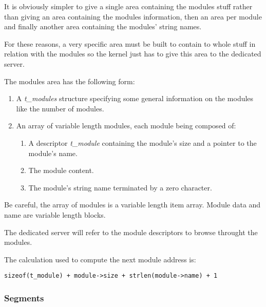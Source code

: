 It is obviously simpler to give a single area containing the modules
stuff rather than giving an area containing the modules information, then
an area per module and finally another area containing the modules' string
names.

For these reasons, a very specific area must be built to contain
to whole stuff in relation with the modules so the kernel just has to
give this area to the dedicated server.

The modules area has the following form:

\begin{enumerate}
  \item
    A \textit{t\_modules} structure specifying some general information on
    the modules like the number of modules.
  \item
    An array of variable length modules, each module being composed of:

    \begin{enumerate}
      \item
	A descriptor \textit{t\_module} containing the module's size and
	a pointer to the module's name.
      \item
	The module content.
      \item
	The module's string name terminated by a zero character.
    \end{enumerate}
\end{enumerate}

Be careful, the array of modules is a variable length item array.
Module data and name are variable length blocks.

The dedicated server will refer to the module descriptors to browse
throught the modules.

The calculation used to compute the next module address is:

\begin{verbatim}
sizeof(t_module) + module->size + strlen(module->name) + 1
\end{verbatim}


%
%

\subsubsection{Segments}

